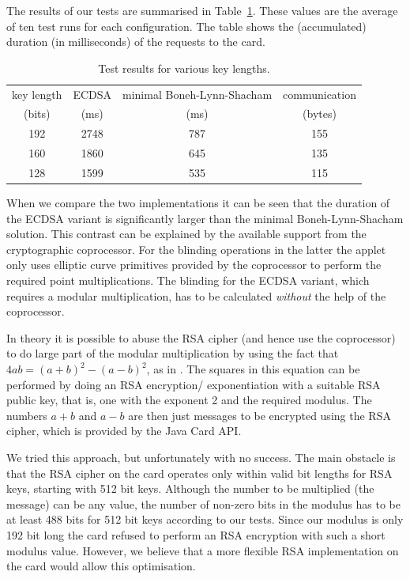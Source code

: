 The results of our tests are summarised in Table~\ref{tab:sbc-results}. These
values are the average of ten test runs for each configuration. The table shows
the (accumulated) duration (in milliseconds) of the requests to the card.

\begin{table}[ht]
  \centering
  \caption{Test results for various key lengths.}
  \label{tab:sbc-results}
  \renewcommand{\tabcolsep}{1.25mm}
  \renewcommand{\arraystretch}{1.25}
  \begin{tabular}{| c || c | c || c |}\hline
    key length & ECDSA & minimal Boneh-Lynn-Shacham & communication \\
    (bits) & (ms) & (ms) & (bytes) \\\hline\hline
    192 & 2748 & 787 & 155 \\\hline
    160 & 1860 & 645 & 135 \\\hline
    128 & 1599 & 535 & 115 \\\hline
  \end{tabular}
\end{table}

When we compare the two implementations it can be seen that the duration of the
ECDSA variant is significantly larger than the minimal Boneh-Lynn-Shacham
solution. This contrast can be explained by the available support from the
cryptographic coprocessor. For the blinding operations in the latter the applet
only uses elliptic curve primitives provided by the coprocessor to perform the
required point multiplications. The blinding for the ECDSA variant, which 
requires a modular multiplication, has to be calculated \emph{without} the help
of the coprocessor.

In theory it is possible to abuse the RSA cipher (and hence 
use the coprocessor) to do large part of the modular multiplication by using 
the fact that $4ab = (a+b)^2 - (a-b)^2$, as in \cite{Sterckx09,TewsJacobs09}. 
The squares in this equation can be performed by doing an RSA encryption\slash 
exponentiation with a suitable RSA public key, that is, one with the exponent 2
and the required modulus. The numbers $a+b$ and $a-b$ are then just messages to
be encrypted using the RSA cipher, which is provided by the Java 
Card API.

We tried this approach, but unfortunately with no success. The main obstacle is
that the RSA cipher on the card operates only within valid bit lengths for RSA
keys, starting with 512 bit keys. Although the number to be multiplied (the
message) can be any value, the number of non-zero bits in the modulus has to be
at least 488 bits for 512 bit keys according to our tests. Since our modulus is
only 192 bit long the card refused to perform an RSA encryption with such a
short modulus value. However, we believe that a more flexible RSA implementation
on the card would allow this optimisation.

